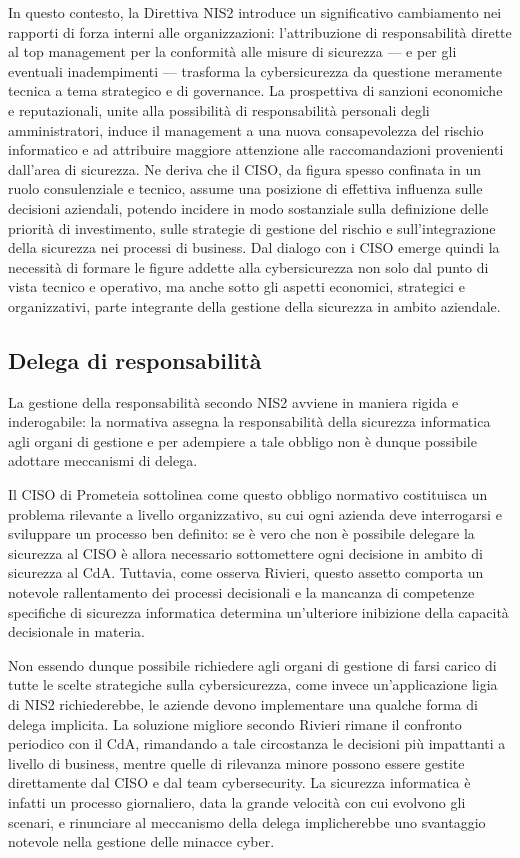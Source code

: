 In questo contesto, la Direttiva NIS2 introduce un significativo cambiamento nei rapporti di forza interni alle organizzazioni: 
l’attribuzione di responsabilità dirette al top management per la conformità alle misure di sicurezza — e per gli eventuali 
inadempimenti — trasforma la cybersicurezza da questione meramente tecnica a tema strategico e di governance.
La prospettiva di sanzioni economiche e reputazionali, unite alla possibilità di responsabilità personali degli amministratori, 
induce il management a una nuova consapevolezza del rischio informatico e ad attribuire maggiore attenzione alle raccomandazioni 
provenienti dall’area di sicurezza. Ne deriva che il CISO, da figura spesso confinata in un ruolo consulenziale e tecnico, assume 
una posizione di effettiva influenza sulle decisioni aziendali, potendo incidere in modo sostanziale sulla definizione delle 
priorità di investimento, sulle strategie di gestione del rischio e sull’integrazione della sicurezza nei processi di business. 
Dal dialogo con i CISO emerge quindi la necessità di formare le figure addette alla cybersicurezza non solo dal punto di vista
tecnico e operativo, ma anche sotto gli aspetti economici, strategici e organizzativi, parte integrante della gestione
della sicurezza in ambito aziendale.


\subsection{Delega di responsabilità}
La gestione della responsabilità secondo NIS2 avviene in maniera rigida e inderogabile: la normativa assegna
la responsabilità della sicurezza informatica agli organi di gestione e per adempiere a tale obbligo non è 
dunque possibile adottare meccanismi di delega.

Il CISO di Prometeia sottolinea come questo obbligo normativo costituisca un problema rilevante
a livello organizzativo, su cui ogni azienda deve interrogarsi e sviluppare un processo ben definito:
se è vero che non è possibile delegare la sicurezza al CISO è allora necessario sottomettere ogni decisione
in ambito di sicurezza al CdA. Tuttavia, come osserva Rivieri, questo assetto comporta un notevole rallentamento 
dei processi decisionali e la mancanza di competenze specifiche di sicurezza informatica determina
un'ulteriore inibizione della capacità decisionale in materia.

Non essendo dunque possibile richiedere agli organi di gestione di farsi carico di tutte le scelte strategiche 
sulla cybersicurezza, come invece un'applicazione ligia di NIS2 richiederebbe, le aziende devono implementare
una qualche forma di delega implicita. La soluzione migliore secondo Rivieri rimane il confronto periodico 
con il CdA, rimandando a tale circostanza le decisioni più impattanti a livello di business, mentre quelle
di rilevanza minore possono essere gestite direttamente dal CISO e dal team cybersecurity. La sicurezza
informatica è infatti un processo giornaliero, data la grande velocità con cui evolvono gli scenari, e 
rinunciare al meccanismo della delega implicherebbe uno svantaggio notevole nella gestione delle minacce cyber.

